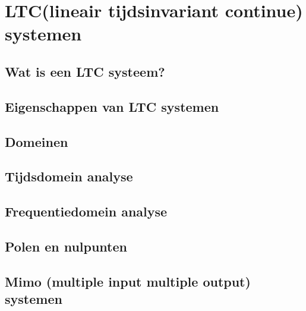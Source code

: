 \chapter{LTC(lineair tijdsinvariant continue) systemen}
\label{ch:ltc_systemen}

\section{Wat is een LTC systeem?}

\section{Eigenschappen van LTC systemen}


\section{Domeinen}

\section{Tijdsdomein analyse}

\section{Frequentiedomein analyse}

\section{Polen en nulpunten}


\section{Mimo (multiple input multiple output) systemen}



